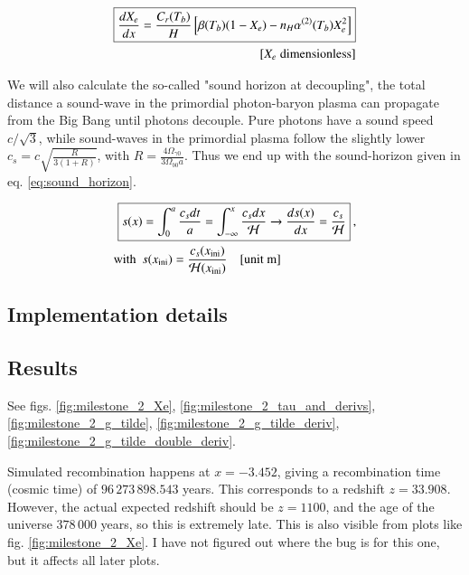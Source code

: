 \begin{equation}\label{eq:peebles_equation}
\begin{aligned}
\boxed{\frac{dX_e}{dx} = \frac{C_r(T_b)}{H} \left[\beta(T_b)(1-X_e) - n_H \alpha^{(2)}(T_b)X_e^2\right]} \\
{[X_e \; \rm dimensionless]}
\end{aligned}
\end{equation}

We will also calculate the so-called "sound horizon at decoupling", the total distance a sound-wave in the primordial photon-baryon plasma can propagate from the Big Bang until photons decouple. Pure photons have a sound speed $c/\sqrt{3}$, while sound-waves in the primordial plasma follow the slightly lower $c_s = c \sqrt{\frac{R}{3(1+R)}}$, with $R = \frac{4\Omega_{\gamma 0}}{3\Omega_{b 0} a}$. Thus we end up with the sound-horizon given in eq. \ref{eq:sound_horizon}.

\begin{equation}\label{eq:sound_horizon}
\begin{aligned}
\Aboxed{s(x) &= \int_0^{a} \frac{c_s dt}{a} = \int_{-\infty}^{x} \frac{c_s dx}{\mathcal{H}} \to \frac{ds(x)}{dx} = \frac{c_s}{\mathcal{H}}}\:,\\
\text{with}\,\,\,&s(x_{\rm ini}) = \frac{c_s(x_{\rm ini})}{\mathcal{H}(x_{\rm ini})} \quad {\text{[unit \unit{m}]}}
\end{aligned}
\end{equation}


\subsection{Implementation details}

\subsection{Results}
See figs. \ref{fig:milestone_2_Xe}, \ref{fig:milestone_2_tau_and_derivs}, \ref{fig:milestone_2_g_tilde}, \ref{fig:milestone_2_g_tilde_deriv}, \ref{fig:milestone_2_g_tilde_double_deriv}.

Simulated recombination happens at $x = -3.452$, giving a recombination time (cosmic time) of $96\, 273\, 898.543$ years. This corresponds to a redshift $z = 33.908$. However, the actual expected redshift should be $z=1100$, and the age of the universe $378\, 000$ years, so this is extremely late. This is also visible from plots like fig. \ref{fig:milestone_2_Xe}. I have not figured out where the bug is for this one, but it affects all later plots.

